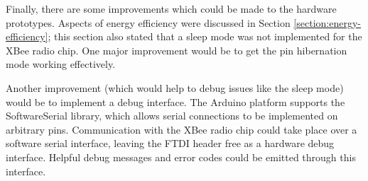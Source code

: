     Finally, there are some improvements which could be made to the hardware prototypes. Aspects of energy efficiency were discussed in Section \ref{section:energy-efficiency}; this section also stated that a sleep mode was not implemented for the XBee radio chip. One major improvement would be to get the pin hibernation mode working effectively.

    Another improvement (which would help to debug issues like the sleep mode) would be to implement a debug interface. The Arduino platform supports the SoftwareSerial library, which allows serial connections to be implemented on arbitrary pins. Communication with the XBee radio chip could take place over a software serial interface, leaving the FTDI header free as a hardware debug interface. Helpful debug messages and error codes could be emitted through this interface.

